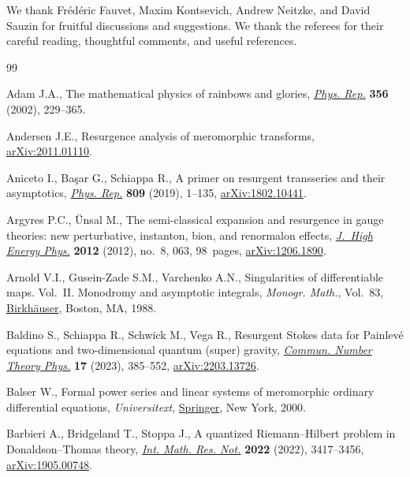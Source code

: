 \documentclass[10pt,a4paper]{amsart}
\numberwithin{equation}{section}
\begin{document}
We thank Fr\'ed\'eric Fauvet, Maxim Kontsevich, Andrew Neitzke, and David Sauzin for fruitful discussions and suggestions. We thank the referees for their careful reading, thoughtful comments, and useful references.


\begin{thebibliography}{99}
\footnotesize\itemsep=0pt

Adam J.A., The mathematical physics of rainbows and glories,
 \href{https://doi.org/10.1016/S0370-1573(01)00076-X}{\textit{Phys. Rep.}}
 \textbf{356} (2002), 229--365.

Andersen J.E., Resurgence analysis of meromorphic transforms,
 \href{http://arxiv.org/abs/2011.01110}{arXiv:2011.01110}.

Aniceto I., Ba\c{s}ar G., Schiappa R., A primer on resurgent transseries and
 their asymptotics,
 \href{https://doi.org/10.1016/j.physrep.2019.02.003}{\textit{Phys. Rep.}}
 \textbf{809} (2019), 1--135,
 \href{http://arxiv.org/abs/1802.10441}{arXiv:1802.10441}.

Argyres P.C., \"Unsal M., The semi-classical expansion and resurgence in gauge
 theories: new perturbative, instanton, bion, and renormalon effects,
 \href{https://doi.org/10.1007/JHEP08(2012)063}{\textit{J.~High Energy Phys.}}
 \textbf{2012} (2012), no.~8, 063, 98~pages,
 \href{http://arxiv.org/abs/1206.1890}{arXiv:1206.1890}.

Arnold V.I., Gusein-Zade S.M., Varchenko A.N., Singularities of differentiable
 maps. {V}ol.~{II}. {M}onodromy and asymptotic integrals, \textit{Monogr.
 Math.}, Vol.~83,
 \href{https://doi.org/10.1007/978-1-4612-3940-6}{Birkh\"auser}, Boston, MA,
 1988.

Baldino S., Schiappa R., Schwick M., Vega R., Resurgent {S}tokes data for
 {P}ainlev\'e equations and two-dimensional quantum (super) gravity,
 \href{https://doi.org/10.4310/cntp.2023.v17.n2.a5}{\textit{Commun. Number
 Theory Phys.}} \textbf{17} (2023), 385--552,
 \href{http://arxiv.org/abs/2203.13726}{arXiv:2203.13726}.

Balser W., Formal power series and linear systems of meromorphic ordinary
 differential equations, \textit{Universitext},
 \href{https://doi.org/10.1007/b97608}{Springer}, New York, 2000.

Barbieri A., Bridgeland T., Stoppa J., A quantized {R}iemann--{H}ilbert problem
 in {D}onaldson--{T}homas theory,
 \href{https://doi.org/10.1093/imrn/rnaa294}{\textit{Int. Math. Res. Not.}}
 \textbf{2022} (2022), 3417--3456,
 \href{http://arxiv.org/abs/1905.00748}{arXiv:1905.00748}.


\end{thebibliography}
\end{document}
